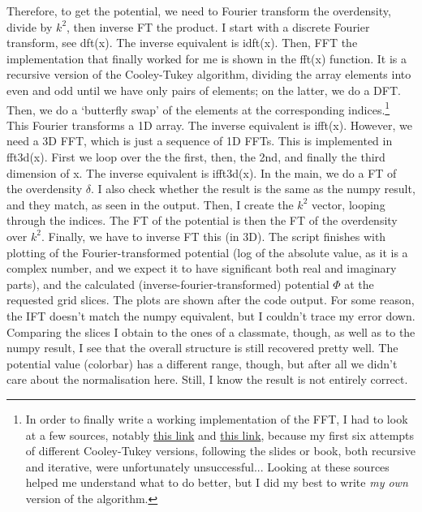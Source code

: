 \documentclass{article}
\begin{document}
Therefore, to get the potential, we need to Fourier transform the overdensity, divide by $k^2$, then inverse FT the product. I start with a discrete Fourier transform, see dft(x). The inverse equivalent is idft(x). Then, FFT the implementation that finally worked for me is shown in the fft(x) function. It is a recursive version of the Cooley-Tukey algorithm, dividing the array elements into even and odd until we have only pairs of elements; on the latter, we do a DFT. Then, we do a `butterfly swap' of the elements at the corresponding indices.\footnote{In order to finally write a working implementation of the FFT, I had to look at a few sources, notably \href{https://www.algorithm-archive.org/contents/cooley_tukey/cooley_tukey.html}{this link} and \href{https://jakevdp.github.io/blog/2013/08/28/understanding-the-fft/}{this link}, because my first six attempts of different Cooley-Tukey versions, following the slides or book, both recursive and iterative, were unfortunately unsuccessful... Looking at these sources helped me understand what to do better, but I did my best to write \emph{my own} version of the algorithm.} This Fourier transforms a 1D array. The inverse equivalent is ifft(x). However, we need a 3D FFT, which is just a sequence of 1D FFTs. This is implemented in fft\textunderscore3d(x). First we loop over the the first, then, the 2nd, and finally the third dimension of x. The inverse equivalent is ifft\textunderscore3d(x). In the main, we do a FT of the overdensity $\delta$. I also check whether the result is the same as the numpy result, and they match, as seen in the output. Then, I create the $k^2$ vector, looping through the indices. The FT of the potential is then the FT of the overdensity over $k^2$. Finally, we have to inverse FT this (in 3D). The script finishes with plotting of the Fourier-transformed potential (log of the absolute value, as it is a complex number, and we expect it to have significant both real and imaginary parts), and the calculated (inverse-fourier-transformed) potential $\Phi$ at the requested grid slices. The plots are shown after the code output. For some reason, the IFT doesn't match the numpy equivalent, but I couldn't trace my error down. Comparing the slices I obtain to the ones of a classmate, though, as well as to the numpy result, I see that the overall structure is still recovered pretty well. The potential value (colorbar) has a different range, though, but after all we didn't care about the normalisation here. Still, I know the result is not entirely correct.


\end{document}
